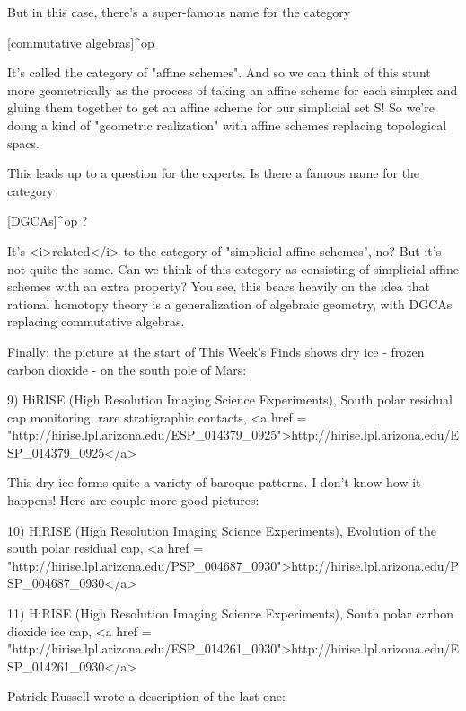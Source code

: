 But in this case, there's a super-famous name for the category

[commutative algebras]^{op}

It's called the category of "affine schemes".  And so we can think
of this stunt more geometrically as the process of taking an affine
scheme for each simplex and gluing them together to get an affine
scheme for our simplicial set S!   So we're doing a kind of "geometric
realization" with affine schemes replacing topological spacs.  

This leads up to a question for the experts.  Is there a famous name
for the category

[DGCAs]^{op} ?

It's <i>related</i> to the category of "simplicial affine schemes",
no?  But it's not quite the same.  Can we think of this category as
consisting of simplicial affine schemes with an extra property?  You
see, this bears heavily on the idea that rational homotopy theory is a
generalization of algebraic geometry, with DGCAs replacing commutative
algebras.

Finally: the picture at the start of This Week's Finds shows dry ice -
frozen carbon dioxide - on the south pole of Mars:

9) HiRISE (High Resolution Imaging Science Experiments), 
South polar residual cap monitoring: rare stratigraphic contacts,
<a href = "http://hirise.lpl.arizona.edu/ESP_014379_0925">http://hirise.lpl.arizona.edu/ESP_014379_0925</a>

This dry ice forms quite a variety of baroque patterns.  I don't
know how it happens!  Here are couple more good pictures:

10) HiRISE (High Resolution Imaging Science Experiments), 
Evolution of the south polar residual cap,
<a href = "http://hirise.lpl.arizona.edu/PSP_004687_0930">http://hirise.lpl.arizona.edu/PSP_004687_0930</a>

11) HiRISE (High Resolution Imaging Science Experiments), 
South polar carbon dioxide ice cap,
<a href = "http://hirise.lpl.arizona.edu/ESP_014261_0930">http://hirise.lpl.arizona.edu/ESP_014261_0930</a>

Patrick Russell wrote a description of the last one:

